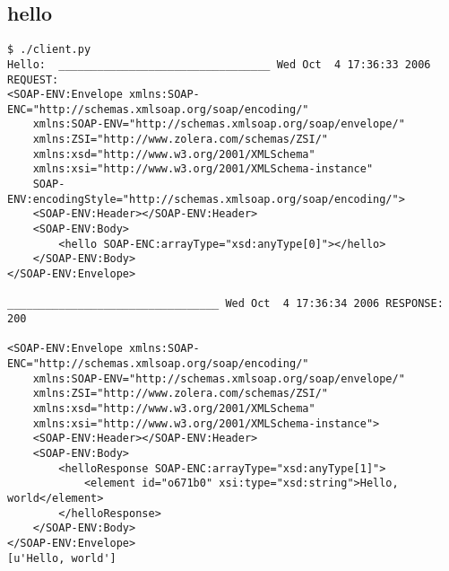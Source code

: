 \subsection{hello}
\begin{verbatim}
$ ./client.py
Hello:  _________________________________ Wed Oct  4 17:36:33 2006 REQUEST:
<SOAP-ENV:Envelope xmlns:SOAP-ENC="http://schemas.xmlsoap.org/soap/encoding/"
	xmlns:SOAP-ENV="http://schemas.xmlsoap.org/soap/envelope/"
	xmlns:ZSI="http://www.zolera.com/schemas/ZSI/"
	xmlns:xsd="http://www.w3.org/2001/XMLSchema"
	xmlns:xsi="http://www.w3.org/2001/XMLSchema-instance"
	SOAP-ENV:encodingStyle="http://schemas.xmlsoap.org/soap/encoding/">
	<SOAP-ENV:Header></SOAP-ENV:Header>
	<SOAP-ENV:Body>
		<hello SOAP-ENC:arrayType="xsd:anyType[0]"></hello>
	</SOAP-ENV:Body>
</SOAP-ENV:Envelope>

_________________________________ Wed Oct  4 17:36:34 2006 RESPONSE:
200

<SOAP-ENV:Envelope xmlns:SOAP-ENC="http://schemas.xmlsoap.org/soap/encoding/"
	xmlns:SOAP-ENV="http://schemas.xmlsoap.org/soap/envelope/"
	xmlns:ZSI="http://www.zolera.com/schemas/ZSI/"
	xmlns:xsd="http://www.w3.org/2001/XMLSchema"
	xmlns:xsi="http://www.w3.org/2001/XMLSchema-instance">
	<SOAP-ENV:Header></SOAP-ENV:Header>
	<SOAP-ENV:Body>
		<helloResponse SOAP-ENC:arrayType="xsd:anyType[1]">
			<element id="o671b0" xsi:type="xsd:string">Hello, world</element>
		</helloResponse>
	</SOAP-ENV:Body>
</SOAP-ENV:Envelope>
[u'Hello, world']
\end{verbatim}

